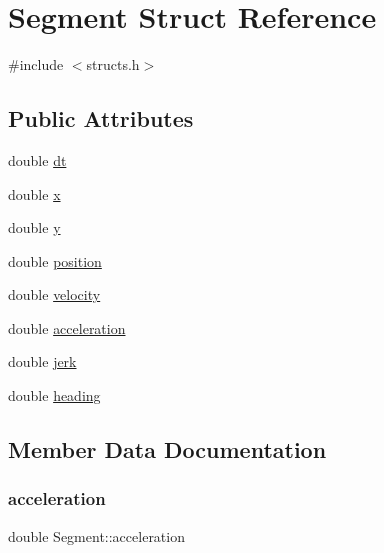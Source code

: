 \hypertarget{structSegment}{}\section{Segment Struct Reference}
\label{structSegment}


{\ttfamily \#include $<$structs.\+h$>$}

\subsection*{Public Attributes}
\begin{DoxyCompactItemize}
\item 
double \mbox{\hyperlink{structSegment_a1c8c1f9833a902cca80b526c784da226}{dt}}
\item 
double \mbox{\hyperlink{structSegment_adccf25d63da0a3e5237050c4eb3b6be4}{x}}
\item 
double \mbox{\hyperlink{structSegment_aba4eb12927d2167032feed9e783196b4}{y}}
\item 
double \mbox{\hyperlink{structSegment_a6fe5b9e467a07d58b649a72e601bfeb4}{position}}
\item 
double \mbox{\hyperlink{structSegment_a4a985c3c994754bd7f81b1bcaf47dbca}{velocity}}
\item 
double \mbox{\hyperlink{structSegment_a4c4c3fe53d9dc4d6aba456f3a4714e14}{acceleration}}
\item 
double \mbox{\hyperlink{structSegment_a16db382476da198c222d2ef4774dc6f3}{jerk}}
\item 
double \mbox{\hyperlink{structSegment_a6c2b52352c7175fe9739fc9efdaa3c0b}{heading}}
\end{DoxyCompactItemize}


\subsection{Member Data Documentation}
\mbox{\label{structSegment_a4c4c3fe53d9dc4d6aba456f3a4714e14}} 
\subsubsection{\texorpdfstring{acceleration}{acceleration}}
{\footnotesize\ttfamily double Segment\+::acceleration}

\mbox{\label{structSegment_a1c8c1f9833a902cca80b526c784da226}} 
